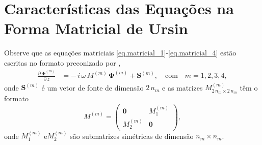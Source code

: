 \section{Caracter\'isticas das Equa\c{c}\~oes na Forma Matricial de Ursin}

%
Observe que as equa\c{c}\~oes matriciais \ref{eq.matricial_1}-\ref{eq.matricial_4} est\~ao escritas no formato preconizado por \cite{Ursin-1983}, 
\begin{align}\label{eq.matricial}
\frac{\partial\,\mathbf{\Phi}^{(m)}}{\partial\,z} &= -\,i\,\omega\,M^{(m)}\,\mathbf{\Phi}^{(m)}+\mathbf{S}^{(m)},\quad\text{com}\quad m=1,2,3,4,
\end{align}
onde $\mathbf{S}^{(m)}$ \'e um vetor de fonte de dimens\~ao $2\,n_m$ e as matrizes $M^{(m)}_{2\,n_m\times2\,n_m}$ t\^em o formato
\begin{equation}
M^{(m)}
=
\begin{pmatrix}
\mathbf{0}&M_1^{(m)}\\
M_2^{(m)}&\mathbf{0}
\end{pmatrix},
\end{equation}
onde $M_1^{(m)}$ e$M_2^{(m)}$ s\~ao submatrizes sim\'etricas de dimens\~ao $n_m\times n_m$.

